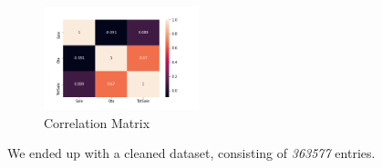 \begin{figure}[!h]
\centering
\includegraphics[width=0.4\textwidth]{img/understanding/dataset_corr.png}
\caption{Correlation Matrix}
\label{fig:dataset_corr}
\end{figure}

We ended up with a cleaned dataset, consisting of \emph{363577} entries.
